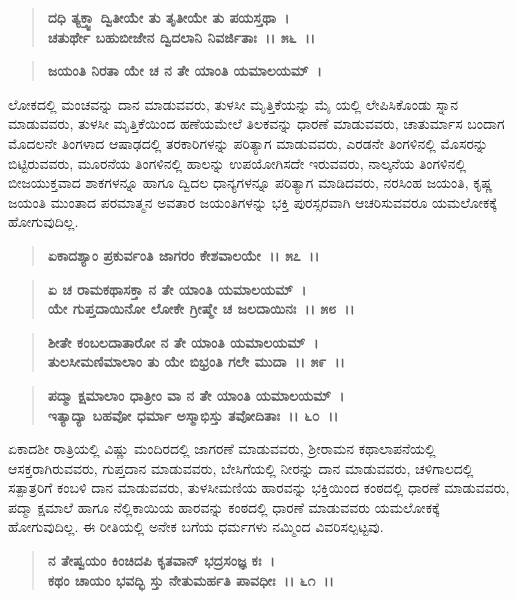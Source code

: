 \begin{verse}
\textbf{ದಧಿ ತ್ಯಕ್ತ್ವಾ ದ್ವಿತೀಯೇ ತು ತೃತೀಯೇ ತು ಪಯಸ್ತಥಾ~।}\\\textbf{ಚತುರ್ಥೇ ಬಹುಬೀಜೇನ ದ್ವಿದಲಾನಿ ನಿವರ್ಜಿತಾಃ~।। ೫೬~।। }
\end{verse}

\begin{verse}
\textbf{ಜಯಂತಿ ನಿರತಾ ಯೇ ಚ ನ ತೇ ಯಾಂತಿ ಯಮಾಲಯಮ್~।}
\end{verse}

ಲೋಕದಲ್ಲಿ ಮಂಚವನ್ನು ದಾನ ಮಾಡುವವರು, ತುಳಸೀ ಮೃತ್ತಿಕೆಯನ್ನು ಮೈ ಯಲ್ಲಿ ಲೇಪಿಸಿಕೊಂಡು ಸ್ನಾನ ಮಾಡುವವರು, ತುಳಸೀ ಮೃತ್ತಿಕೆಯಿಂದ ಹಣೆಯಮೇಲೆ ತಿಲಕವನ್ನು ಧಾರಣೆ ಮಾಡುವವರು, ಚಾತುರ್ಮಾಸ ಬಂದಾಗ ಮೊದಲನೇ ತಿಂಗಳಾದ ಆಷಾಢದಲ್ಲಿ ತರಕಾರಿಗಳನ್ನು ಪರಿತ್ಯಾಗ ಮಾಡುವವರು, ಎರಡನೇ ತಿಂಗಳಿನಲ್ಲಿ ಮೊಸರನ್ನು ಬಿಟ್ಟಿರುವವರು, ಮೂರನೆಯ ತಿಂಗಳಿನಲ್ಲಿ ಹಾಲನ್ನು ಉಪಯೋಗಿಸದೇ ಇರುವವರು, ನಾಲ್ಕನೆಯ ತಿಂಗಳಿನಲ್ಲಿ ಬೀಜಯುಕ್ತವಾದ ಶಾಕಗಳನ್ನೂ ಹಾಗೂ ದ್ವಿದಲ ಧಾನ್ಯಗಳನ್ನೂ ಪರಿತ್ಯಾಗ ಮಾಡಿದವರು, ನರಸಿಂಹ ಜಯಂತಿ, ಕೃಷ್ಣ ಜಯಂತಿ ಮುಂತಾದ ಪರಮಾತ್ಮನ ಅವತಾರ ಜಯಂತಿಗಳನ್ನು ಭಕ್ತಿ ಪುರಸ್ಸರವಾಗಿ ಆಚರಿಸುವವರೂ ಯಮಲೋಕಕ್ಕೆ ಹೋಗುವುದಿಲ್ಲ.

\begin{verse}
\textbf{ಏಕಾದಶ್ಯಾಂ ಪ್ರಕುರ್ವಂತಿ ಜಾಗರಂ ಕೇಶವಾಲಯೇ~।। ೫೭~।। }
\end{verse}

\begin{verse}
\textbf{ಏ ಚ ರಾಮಕಥಾಸಕ್ತಾ ನ ತೇ ಯಾಂತಿ ಯಮಾಲಯಮ್~।}\\\textbf{ಯೇ ಗುಪ್ತದಾಯಿನೋ ಲೋಕೇ ಗ್ರೀಷ್ಮೇ ಚ ಜಲದಾಯಿನಃ~।। ೫೮~।। }
\end{verse}

\begin{verse}
\textbf{ಶೀತೇ ಕಂಬಲದಾತಾರೋ ನ ತೇ ಯಾಂತಿ ಯಮಾಲಯಮ್~।}\\\textbf{ತುಲಸೀಮಣಿಮಾಲಾಂ ತು ಯೇ ಬಿಭ್ರಂತಿ ಗಲೇ ಮುದಾ~।। ೫೯~।। }
\end{verse}

\begin{verse}
\textbf{ಪದ್ಮಾ ಕ್ಷಮಾಲಾಂ ಧಾತ್ರೀಂ ವಾ ನ ತೇ ಯಾಂತಿ ಯಮಾಲಯಮ್~।}\\\textbf{ಇತ್ಯಾದ್ಯಾ ಬಹವೋ ಧರ್ಮಾ ಅಸ್ಮಾಭಿಸ್ತು ತವೋದಿತಾಃ~।। ೬೦~।।}
\end{verse}

ಏಕಾದಶೀ ರಾತ್ರಿಯಲ್ಲಿ ವಿಷ್ಣು ಮಂದಿರದಲ್ಲಿ ಜಾಗರಣೆ ಮಾಡುವವರು, ಶ‍್ರೀರಾಮನ ಕಥಾಲಾಪನೆಯಲ್ಲಿ ಆಸಕ್ತರಾಗಿರುವವರು, ಗುಪ್ತದಾನ ಮಾಡುವವರು, ಬೇಸಿಗೆಯಲ್ಲಿ ನೀರನ್ನು ದಾನ ಮಾಡುವವರು, ಚಳಿಗಾಲದಲ್ಲಿ ಸತ್ಪಾತ್ರರಿಗೆ ಕಂಬಳಿ ದಾನ ಮಾಡುವವರು, ತುಳಸೀಮಣಿಯ ಹಾರವನ್ನು ಭಕ್ತಿಯಿಂದ ಕಂಠದಲ್ಲಿ ಧಾರಣೆ ಮಾಡುವವರು, ಪದ್ಮಾ ಕ್ಷಮಾಲೆ ಹಾಗೂ ನೆಲ್ಲಿಕಾಯಿಯ ಹಾರವನ್ನು ಕಂಠದಲ್ಲಿ ಧಾರಣೆ ಮಾಡುವವರು ಯಮಲೋಕಕ್ಕೆ ಹೋಗುವುದಿಲ್ಲ. ಈ ರೀತಿಯಲ್ಲಿ ಅನೇಕ ಬಗೆಯ ಧರ್ಮಗಳು ನಮ್ಮಿಂದ ವಿವರಿಸಲ್ಪಟ್ಟವು.

\begin{verse}
\textbf{ನ ತೇಷ್ವಯಂ ಕಿಂಚಿದಪಿ ಕೃತವಾನ್ ಭದ್ರಸಂಜ್ಞ ಕಃ~।}\\\textbf{ಕಥಂ ಚಾಯಂ ಭವದ್ಭಿ ಸ್ತು ನೇತುಮರ್ಹತಿ ಪಾವಧೀಃ~।। ೬೧~।। }
\end{verse}

